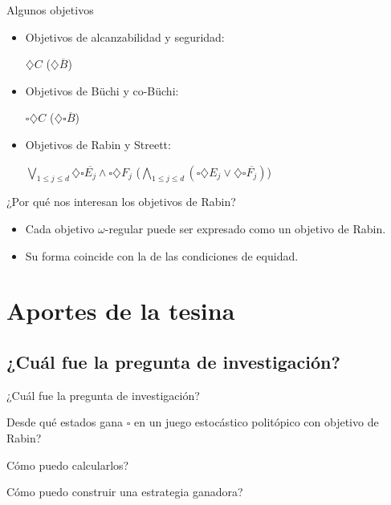 \documentclass{beamer}
\newcommand{\diam}{\diamondsuit}
\newcommand{\cuad}{\square}
\newcommand{\alc}{\diamondsuit}
\newcommand{\siempevent}{\cuad \diam}
\newcommand{\eventsiemp}{\diam \cuad}
\begin{document}
\begin{frame}{Algunos objetivos}
	\pause
	\begin{itemize}
		\item Objetivos de alcanzabilidad y seguridad:

		      $\alc C$ \pause \hspace{1cm} ($\alc \overline{B}$)
		      \pause
		\item Objetivos de Büchi y co-Büchi:

		      $\siempevent C$ \pause \hspace{1cm} ($\eventsiemp \overline{B}$)
		      \pause
		\item Objetivos de Rabin y Streett:

		      $\bigvee_{1 \leq j \leq d} \eventsiemp \overline{E_j} \wedge \siempevent F_j$ \pause \hspace{1cm} ($\bigwedge_{1 \leq j \leq d} (\siempevent E_j \vee \eventsiemp \overline{F_j})$)
	\end{itemize}
\end{frame}

\begin{frame}{¿Por qu\'e nos interesan los objetivos de Rabin?}
	\pause
	\begin{itemize}
		\item Cada objetivo $\omega$-regular puede ser expresado como un objetivo de Rabin.
		      \pause
		\item Su forma coincide con la de las condiciones de equidad.
	\end{itemize}
\end{frame}

\section{Aportes de la tesina}

\subsection{¿Cu\'al fue la pregunta de investigaci\'on?}

\begin{frame}{¿Cu\'al fue la pregunta de investigaci\'on?}
	\begin{center}
		\textquestiondown Desde qu\'e estados gana $\cuad$ en un juego estoc\'astico polit\'opico con objetivo de Rabin?

		\vspace{0.7cm}
		\pause
		\textquestiondown C\'omo puedo calcularlos?

		\vspace{0.7cm}
		\pause
		\textquestiondown C\'omo puedo construir una estrategia ganadora?
	\end{center}
\end{frame}
\end{document}
